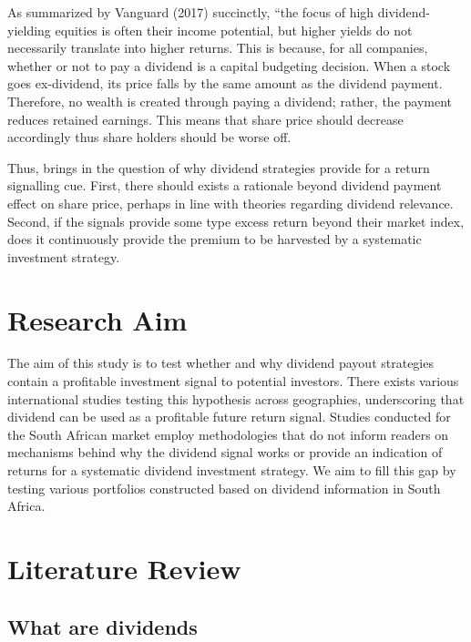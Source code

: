 \documentclass[12pt,preprint, authoryear]{elsarticle}
\numberwithin{equation}{section}
\numberwithin{figure}{section}
\numberwithin{table}{section}
\begin{document}
As summarized by Vanguard (2017) succinctly, ``the focus of high
dividend-yielding equities is often their income potential, but higher
yields do not necessarily translate into higher returns. This is
because, for all companies, whether or not to pay a dividend is a
capital budgeting decision. When a stock goes ex-dividend, its price
falls by the same amount as the dividend payment. Therefore, no wealth
is created through paying a dividend; rather, the payment reduces
retained earnings. This means that share price should decrease
accordingly thus share holders should be worse off.

Thus, brings in the question of why dividend strategies provide for a
return signalling cue. First, there should exists a rationale beyond
dividend payment effect on share price, perhaps in line with theories
regarding dividend relevance. Second, if the signals provide some type
excess return beyond their market index, does it continuously provide
the premium to be harvested by a systematic investment strategy.

\hypertarget{research-aim}{%
\section{Research Aim}\label{research-aim}}

The aim of this study is to test whether and why dividend payout
strategies contain a profitable investment signal to potential
investors. There exists various international studies testing this
hypothesis across geographies, underscoring that dividend can be used as
a profitable future return signal. Studies conducted for the South
African market employ methodologies that do not inform readers on
mechanisms behind why the dividend signal works or provide an indication
of returns for a systematic dividend investment strategy. We aim to fill
this gap by testing various portfolios constructed based on dividend
information in South Africa.

\hypertarget{literature-review}{%
\section{Literature Review}\label{literature-review}}

\hypertarget{what-are-dividends}{%
\subsection{What are dividends}\label{what-are-dividends}}
\end{document}
